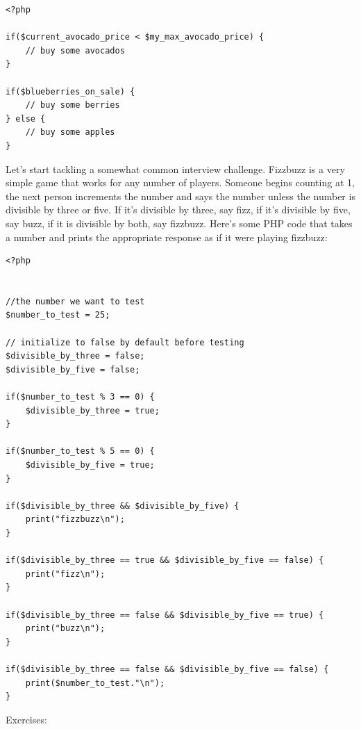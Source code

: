 \documentclass[
]{book}
\begin{document}
\begin{verbatim}
<?php

if($current_avocado_price < $my_max_avocado_price) {
    // buy some avocados
}

if($blueberries_on_sale) {
    // buy some berries
} else {
    // buy some apples
}
\end{verbatim}

Let's start tackling a somewhat common interview challenge. Fizzbuzz is a very simple game that works for any number of players. Someone begins counting at 1, the next person increments the number and says the number unless the number is divisible by three or five. If it's divisible by three, say fizz, if it's divisible by five, say buzz, if it is divisible by both, say fizzbuzz. Here's some PHP code that takes a number and prints the appropriate response as if it were playing fizzbuzz:

\begin{verbatim}
<?php


//the number we want to test
$number_to_test = 25;

// initialize to false by default before testing
$divisible_by_three = false;
$divisible_by_five = false;

if($number_to_test % 3 == 0) {
    $divisible_by_three = true;
}

if($number_to_test % 5 == 0) {
    $divisible_by_five = true;
}

if($divisible_by_three && $divisible_by_five) {
    print("fizzbuzz\n");
}

if($divisible_by_three == true && $divisible_by_five == false) {
    print("fizz\n");
}

if($divisible_by_three == false && $divisible_by_five == true) {
    print("buzz\n");
}

if($divisible_by_three == false && $divisible_by_five == false) {
    print($number_to_test."\n");
}
\end{verbatim}

Exercises:
\end{document}
